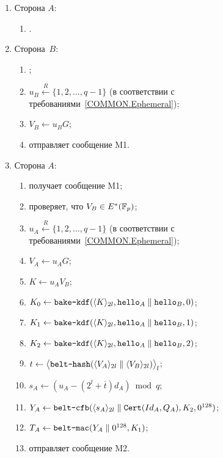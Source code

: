 \begin{enumerate}
\item
Сторона $A$:
\begin{enumerate}
\item
{}.
\end{enumerate}

\item
Сторона~$B$:
\begin{enumerate}
\item
{};
\item
$u_B\stackrel{R}{\leftarrow}\{1,2,\ldots,q-1\}$
(в соответствии с требованиями~\ref{COMMON.Ephemeral});
\item
$V_B\leftarrow u_B G$;
\item
отправляет сообщение M1.
\end{enumerate}

\item
Сторона $A$:
\begin{enumerate}
\item
получает сообщение M1;
\item
проверяет, что $V_B\in E^*(\mathbb{F}_p)$;
\item
$u_A\stackrel{R}{\leftarrow}\{1,2,\ldots,q-1\}$
(в соответствии с требованиями~\ref{COMMON.Ephemeral});
\item
$V_A\leftarrow u_{A} G$;
\item
$K\leftarrow u_A V_B$;
\item
$K_0\leftarrow\texttt{bake-kdf}
(\langle K\rangle_{2l},\texttt{hello}_A\parallel\texttt{hello}_B,0)$;
\item
$K_1\leftarrow\texttt{bake-kdf}
(\langle K\rangle_{2l},\texttt{hello}_A\parallel\texttt{hello}_B,1)$;
\item
$K_2\leftarrow\texttt{bake-kdf}
(\langle K\rangle_{2l},\texttt{hello}_A\parallel\texttt{hello}_B,2)$;
\item
$t\leftarrow\bigl\langle
\texttt{belt-hash}(\langle V_A\rangle_{2l}\parallel\langle V_B\rangle_{2l})
\bigr\rangle_l$;
\item
$s_A\leftarrow (u_A-(2^l +\overline{t})d_A)\bmod q$;
\item
$Y_A\leftarrow\texttt{belt-cfb}
(\langle s_A\rangle_{2l}\parallel\texttt{Cert}(Id_A,Q_A),K_2,0^{128})$;
\item
$T_A\leftarrow\texttt{belt-mac}(Y_A\parallel 0^{128}, K_1)$;
\item
отправляет сообщение M2.
\end{enumerate}


\end{enumerate}

